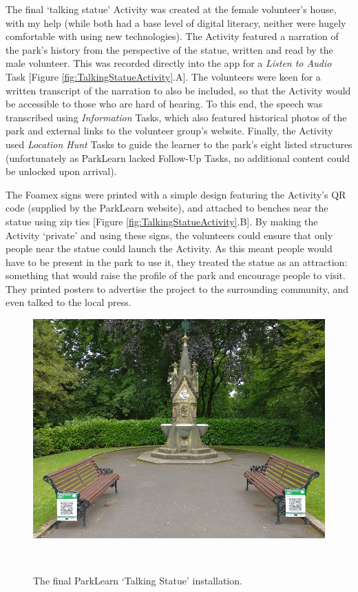 The final `talking statue' Activity was created at the female volunteer's house, with my help (while both had a base level of digital literacy, neither were hugely comfortable with using new technologies). The Activity featured a narration of the park's history from the perspective of the statue, written and read by the male volunteer. This was recorded directly into the app for a \textit{Listen to Audio} Task [Figure \ref{fig:TalkingStatueActivity}.A]. The volunteers were keen for a written transcript of the narration to also be included, so that the Activity would be accessible to those who are hard of hearing. To this end, the speech was transcribed using \textit{Information} Tasks, which also featured historical photos of the park and external links to the volunteer group's website. Finally, the Activity used \textit{Location Hunt} Tasks to guide the learner to the park's eight listed structures (unfortunately as ParkLearn lacked Follow-Up Tasks, no additional content could be unlocked upon arrival).

The Foamex signs were printed with a simple design featuring the Activity's QR code (supplied by the ParkLearn website), and attached to benches near the statue using zip ties [Figure \ref{fig:TalkingStatueActivity}.B]. By making the Activity ‘private’ and using these signs, the volunteers could ensure that only people near the statue could launch the Activity. As this meant people would have to be present in the park to use it, they treated the statue as an attraction: something that would raise the profile of the park and encourage people to visit. They printed posters to advertise the project to the surrounding community, and even talked to the local press. 

\begin{figure}
  \centering
  \includegraphics[width=0.85\columnwidth]{images/chapter06/TalkingStatue.jpg}
  \caption[The ParkLearn `Talking Statue' installation]{The final ParkLearn `Talking Statue' installation.}~\label{fig:TalkingStatue}
\end{figure}

